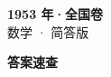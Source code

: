 \documentclass[zihao=-4, a4paper]{ctexart}
\begin{document}
\begin{center}
  {\Large\bfseries 1953 年·全国卷}\\[4pt]
  {\large 数学 · 简答版}
\end{center}
\medskip
{}

\clearpage
{}
\begin{center}{\Large\bfseries 答案速查}\end{center}
\medskip

\end{document}
